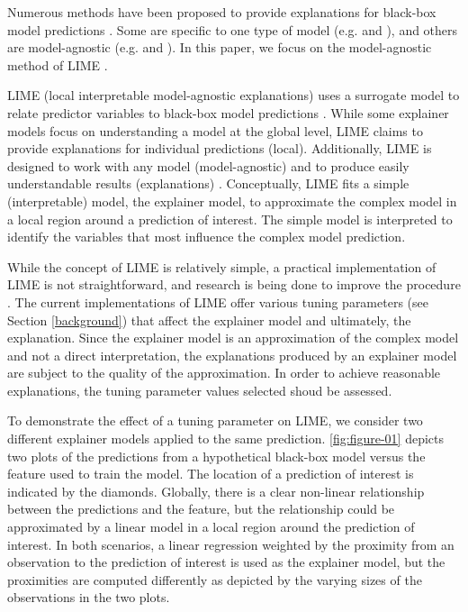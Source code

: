 \documentclass[AMS,STIX2COL]{WileyNJD-v2}\usepackage[]{graphicx}\usepackage[]{color}
\begin{document}
Numerous methods have been proposed to provide explanations for black-box model predictions \citep{gilpin:2018, guidotti:2018, ming:2017, molnar:2019}. Some are specific to one type of model (e.g. \citep{simonyan:2013} and \citep{urbanek:2008}), and others are model-agnostic (e.g. \citep{fisher:2018} and \citep{strumbelj:2014}). In this paper, we focus on the  model-agnostic method of LIME \citep{ribeiro:2016}.

LIME (local interpretable model-agnostic explanations)  uses a surrogate model to relate predictor variables to black-box model predictions  \citep{ribeiro:2016}.  While some explainer models  focus on understanding a model at the global level, LIME claims to provide explanations for individual predictions (local). Additionally, LIME is designed to work with any model (model-agnostic) and to produce easily understandable results (explanations) \citep{ribeiro:2016}. Conceptually, LIME fits a simple (interpretable) model, the explainer model, to approximate  the complex model in a local region around a prediction of interest. The simple model is interpreted to identify the  variables that most influence the complex model prediction.

While the concept of LIME is relatively simple, a practical implementation of LIME is not straightforward, and research is being done to improve the procedure \citep{laugel:2018}. The current implementations of LIME \citep{pedersen:2020, ribeiro:2020} offer various tuning parameters (see Section \ref{background}) that affect the explainer model and ultimately, the explanation. Since the explainer model is an approximation of the complex model and not a direct interpretation, the explanations produced by an explainer model are subject to the quality of the approximation. In order to achieve reasonable  explanations, the tuning parameter values selected shoud  be assessed.

To demonstrate the effect of a tuning parameter on LIME, we consider two different explainer models applied to the same prediction. \autoref{fig:figure-01} depicts two plots of the predictions from a hypothetical black-box model versus the feature used to train the model. The location of a prediction of interest is indicated by the diamonds. Globally, there is a clear non-linear relationship between the predictions and the feature, but the relationship could be approximated by a linear model in a local region around the prediction of interest. In both scenarios, a linear regression weighted by the proximity from an observation to the prediction of interest is used as the explainer model, but the proximities are computed differently as depicted by the varying sizes of the observations in the two plots.
\end{document}
